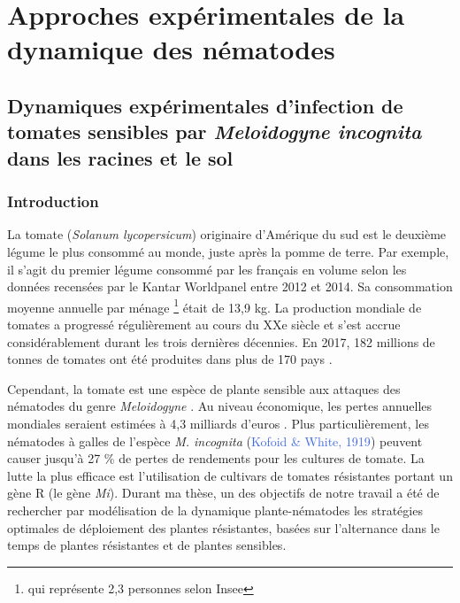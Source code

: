 	
	\renewcommand{\tablename}{Tableau}
	\renewcommand{\figurename}{Figure}
	
	{\chapter{Approches expérimentales de la dynamique des nématodes} \label{chapter4} 
		\label{chap:experimentation}}
	
		\minitoc
		\newpage
		
	
		
	
	
\section[Dynamiques expérimentales d'infection de tomates sensibles par \textit{M.  incognita}]{Dynamiques expérimentales d'infection de tomates sensibles par \textit{Meloidogyne  incognita} dans les racines et le sol} \label{sec:experimentation}
	
	
	
\subsection{Introduction}
	
	La tomate (\textit{Solanum lycopersicum}) originaire d’Amérique du sud  est le deuxième légume le plus consommé au monde, juste après la pomme de terre.
Par exemple, il s’agit du premier légume consommé par les français en volume selon les données recensées par le Kantar Worldpanel entre 2012 et 2014.  Sa consommation moyenne annuelle  par ménage \footnote{qui représente 2,3 personnes selon Insee} était de 13,9 kg. La production mondiale de tomates a progressé régulièrement au cours du XXe siècle et s'est accrue considérablement durant les trois dernières décennies. En 2017, 182  millions de tonnes de tomates ont été produites dans plus de 170  pays  \citep{FAOstat2018}. 
	
	 Cependant, la tomate  est une espèce de plante  sensible aux attaques des nématodes
du  genre \textit{Meloidogyne} \citep{Divito1979, Seid2015}. Au niveau économique, les pertes annuelles mondiales seraient estimées à 4,3 milliards d’euros \citep{McCarter2009}. 
Plus particulièrement, les nématodes à galles de l'espèce \textit{ M. incognita }  (\textcolor{RoyalBlue}{Kofoid \& White, 1919})  peuvent causer jusqu’à 27 \% de pertes de rendements pour les cultures de tomate. La lutte la plus efficace est l'utilisation de cultivars de tomates résistantes portant un gène R (le gène \textit{Mi}). Durant ma  thèse, un des objectifs de notre travail a été de rechercher par
modélisation de la dynamique plante-nématodes les stratégies optimales de déploiement des
plantes résistantes, basées sur l'alternance dans le temps de plantes résistantes et de plantes sensibles. 
	
